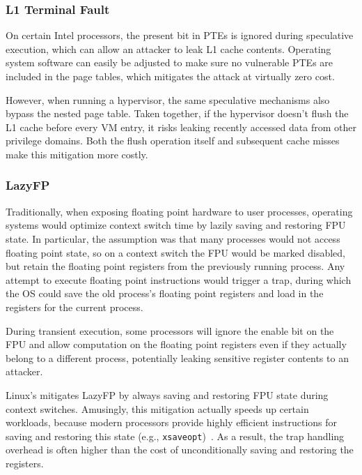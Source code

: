 \subsubsection{L1 Terminal Fault}
On certain Intel processors, the present bit in PTEs is ignored during speculative execution, which can
allow an attacker to leak L1 cache contents.
Operating system software can easily be adjusted to make sure no vulnerable PTEs are included in the page tables, which mitigates the attack at virtually zero cost.

However, when running a hypervisor, the same speculative mechanisms also bypass
the nested page table.
Taken together, if the hypervisor doesn't flush the L1 cache before every VM entry, it risks leaking recently accessed data from other privilege domains.
Both the flush operation itself and subsequent cache misses make this mitigation more costly.

\subsubsection{LazyFP}
Traditionally, when exposing floating point hardware to user processes, operating systems would optimize context switch time by lazily saving and restoring FPU state.
In particular, the assumption was that many processes would not access floating point state, so on a context switch the FPU would be marked disabled, but retain the floating point registers from the previously running process.
Any attempt to execute floating point instructions would trigger a trap, during which the OS could save the old process's floating point registers and load in the registers for the current process.

During transient execution, some processors will ignore the enable bit on the FPU and allow computation on the floating point registers even if they actually belong to a different process, potentially leaking sensitive register contents to an attacker.

Linux's mitigates LazyFP by always saving and restoring FPU state during context
switches.  Amusingly, this mitigation actually speeds up certain workloads,
because modern processors provide highly efficient instructions for saving and
restoring this state (e.g., \texttt{xsaveopt})~\cite{lutomirski:lazyfp-perf}. As
a result, the trap handling overhead is often higher than the cost of unconditionally saving and restoring the registers.


